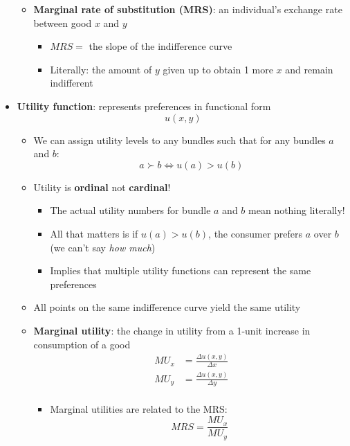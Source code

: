\documentclass{article}
\begin{document}
\begin{itemize}
\begin{itemize}
	\item \textbf{Marginal rate of substitution (MRS)}: an individual's exchange rate between good $x$ and $y$
		\begin{itemize}
		\item $MRS=$ the slope of the indifference curve
		\item Literally: the amount of $y$ given up to obtain 1 more $x$ and remain indifferent 
		\end{itemize}
	\end{itemize}
	\item \textbf{Utility function}: represents preferences in functional form
	\begin{equation*}
	u(x,y)	
	\end{equation*}
	\begin{itemize}
		\item We can assign utility levels to any bundles such that for any bundles $a$ and $b$: 
		\begin{equation*}
		a \succ b \iff u(a) > u(b)	
		\end{equation*}
 		\item Utility is \textbf{ordinal} not \textbf{cardinal}!
 		\begin{itemize}
 			\item The actual utility numbers for bundle $a$ and $b$ mean nothing literally!
 			\item All that matters is if $u(a) > u(b)$, the consumer prefers $a$ over $b$ (we can't say \emph{how much})
 			\item Implies that multiple utility functions can represent the same preferences 
		\end{itemize}
		\item All points on the same indifference curve yield the same utility 
		\item \textbf{Marginal utility}: the change in utility from a 1-unit increase in consumption of a good 
		\begin{align*}
		MU_x&=\frac{\Delta u(x,y)}{\Delta x}\\
		MU_y&=\frac{\Delta u(x,y)}{\Delta y}\\	
		\end{align*}
 		\begin{itemize}
 			\item Marginal utilities are related to the MRS: 
 			\begin{equation*}
 			MRS=\frac{MU_x}{MU_y}	
 			\end{equation*}
 										\begin{figure}[h!]

\end{figure}
\end{itemize}
\end{itemize}
\end{itemize}
\end{document}
